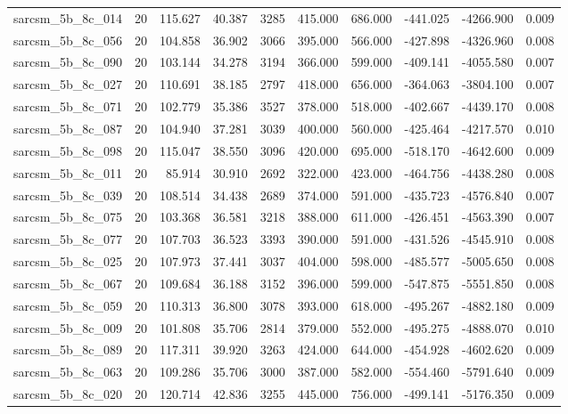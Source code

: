 \begin{tabular}{lrrrrrrrrr}
sarcsm\_5b\_8c\_014 & 20 & 115.627 & 40.387 & 3285 & 415.000 & 686.000 & -441.025 & -4266.900 & 0.009 \\
sarcsm\_5b\_8c\_056 & 20 & 104.858 & 36.902 & 3066 & 395.000 & 566.000 & -427.898 & -4326.960 & 0.008 \\
sarcsm\_5b\_8c\_090 & 20 & 103.144 & 34.278 & 3194 & 366.000 & 599.000 & -409.141 & -4055.580 & 0.007 \\
sarcsm\_5b\_8c\_027 & 20 & 110.691 & 38.185 & 2797 & 418.000 & 656.000 & -364.063 & -3804.100 & 0.007 \\
sarcsm\_5b\_8c\_071 & 20 & 102.779 & 35.386 & 3527 & 378.000 & 518.000 & -402.667 & -4439.170 & 0.008 \\
sarcsm\_5b\_8c\_087 & 20 & 104.940 & 37.281 & 3039 & 400.000 & 560.000 & -425.464 & -4217.570 & 0.010 \\
sarcsm\_5b\_8c\_098 & 20 & 115.047 & 38.550 & 3096 & 420.000 & 695.000 & -518.170 & -4642.600 & 0.009 \\
sarcsm\_5b\_8c\_011 & 20 & 85.914 & 30.910 & 2692 & 322.000 & 423.000 & -464.756 & -4438.280 & 0.008 \\
sarcsm\_5b\_8c\_039 & 20 & 108.514 & 34.438 & 2689 & 374.000 & 591.000 & -435.723 & -4576.840 & 0.007 \\
sarcsm\_5b\_8c\_075 & 20 & 103.368 & 36.581 & 3218 & 388.000 & 611.000 & -426.451 & -4563.390 & 0.007 \\
sarcsm\_5b\_8c\_077 & 20 & 107.703 & 36.523 & 3393 & 390.000 & 591.000 & -431.526 & -4545.910 & 0.008 \\
sarcsm\_5b\_8c\_025 & 20 & 107.973 & 37.441 & 3037 & 404.000 & 598.000 & -485.577 & -5005.650 & 0.008 \\
sarcsm\_5b\_8c\_067 & 20 & 109.684 & 36.188 & 3152 & 396.000 & 599.000 & -547.875 & -5551.850 & 0.008 \\
sarcsm\_5b\_8c\_059 & 20 & 110.313 & 36.800 & 3078 & 393.000 & 618.000 & -495.267 & -4882.180 & 0.009 \\
sarcsm\_5b\_8c\_009 & 20 & 101.808 & 35.706 & 2814 & 379.000 & 552.000 & -495.275 & -4888.070 & 0.010 \\
sarcsm\_5b\_8c\_089 & 20 & 117.311 & 39.920 & 3263 & 424.000 & 644.000 & -454.928 & -4602.620 & 0.009 \\
sarcsm\_5b\_8c\_063 & 20 & 109.286 & 35.706 & 3000 & 387.000 & 582.000 & -554.460 & -5791.640 & 0.009 \\
sarcsm\_5b\_8c\_020 & 20 & 120.714 & 42.836 & 3255 & 445.000 & 756.000 & -499.141 & -5176.350 & 0.009 \\

\end{tabular}
